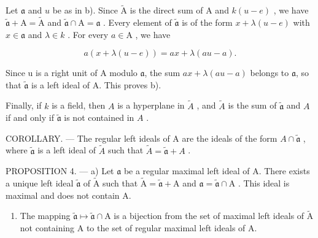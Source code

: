 Let \(\mathfrak{a}\) and \(u\) be as in b). Since \(\widetilde{\mathrm{A}}\) is the direct sum of \(\mathrm{A}\) and \(k(u - e)\) , we have \(\widetilde{\mathfrak{a}} + \mathrm{A} = \widetilde{\mathrm{A}}\) and \(\widetilde{\mathfrak{a}} \cap \mathrm{A} = \mathfrak{a}\) . Every element of \(\widetilde{\mathfrak{a}}\) is of the form \(x + \lambda (u - e)\) with \(x \in \mathfrak{a}\) and \(\lambda \in k\) . For every \(a \in \mathrm{A}\) , we have

\[
a (x + \lambda (u - e)) = a x + \lambda (a u - a).
\]

Since u is a right unit of A modulo \(\mathfrak{a}\), the sum \(ax + \lambda(au - a)\) belongs to \(\mathfrak{a}\), so that \(\widetilde{\mathfrak{a}}\) is a left ideal of A. This proves b).

Finally, if \(k\) is a field, then \(A\) is a hyperplane in \(\widetilde{A}\) , and \(\widetilde{A}\) is the sum of \(\widetilde{\mathfrak{a}}\) and \(A\) if and only if \(\widetilde{\mathfrak{a}}\) is not contained in \(A\) .

COROLLARY. --- The regular left ideals of A are the ideals of the form \(A \cap \widetilde{\mathfrak{a}}\) , where \(\widetilde{\mathfrak{a}}\) is a left ideal of \(\widetilde{A}\) such that \(\widetilde{A} = \widetilde{\mathfrak{a}} + A\) .

PROPOSITION 4. --- a) Let \(\mathfrak{a}\) be a regular maximal left ideal of A. There exists a unique left ideal \(\widetilde{\mathfrak{a}}\) of \(\widetilde{\mathrm{A}}\) such that \(\widetilde{\mathrm{A}} = \widetilde{\mathfrak{a}} + \mathrm{A}\) and \(\mathfrak{a} = \widetilde{\mathfrak{a}} \cap \mathrm{A}\) . This ideal is maximal and does not contain A.

\begin{enumerate}
\def\labelenumi{\alph{enumi})}
\setcounter{enumi}{1}
\tightlist
\item
  The mapping \(\widetilde{\mathfrak{a}}\mapsto \widetilde{\mathfrak{a}}\cap \mathrm{A}\) is a bijection from the set of maximal left ideals of \(\widetilde{\mathrm{A}}\) not containing A to the set of regular maximal left ideals of A.
\end{enumerate}

